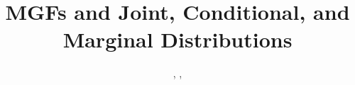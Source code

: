 \documentclass[11.5pt]{article}
\title{MGFs and Joint, Conditional, and Marginal Distributions}
\author{\shira, \tim, \creds}
\begin{document}
\maketitle

\begin{notes}

\begin{comment}
\section*{Exponential Distribution (Continuous)}

Let us say that $X$ is distributed $\Expo(\lambda)$. We know the following:
\begin{description}
	\item[Story] You're sitting on an open meadow right before the break of dawn, wishing that airplanes in the night sky were shooting stars, because you could really use a wish right now. You know that shooting stars come on average every 15 minutes, but it's never true that a shooting star is ever "due" to come because you've waited so long. Your waiting time is memorylessness, which means that the time until the next shooting star comes does not depend on how long you've waited already.
	
	\item[Example] The waiting time until the next shooting star is distributed $\Expo(4)$. The 4 here is $\lambda$, or the rate parameter, or how many shooting stars we expect to see in a unit of time. The expected time until the next shooting star is $\frac{1}{\lambda}$, or $\frac{1}{4}$ of an hour. You can expect to wait 15 minutes until the next shooting star.
	
	\item[All Exponentials are Scaled Versions of Each Other]
		\[Y \sim \Expo(\lambda) \rightarrow X = \lambda Y \sim \Expo(1)\]
	 
	\item[PDF and CDF] The PDF and CDF of a Exponential is:
\begin{eqnarray*}
f(x) = \lambda e^{-\lambda x},
\hspace{.1 in}
x \in [0, \infty)
\hspace{1 in}
F(x) = P(X \leq x) = 1 - e^{-\lambda x},
\hspace{.1 in}
x \in [0, \infty)
\end{eqnarray*}
	


\end{comment}
\end{notes}
\end{document}
